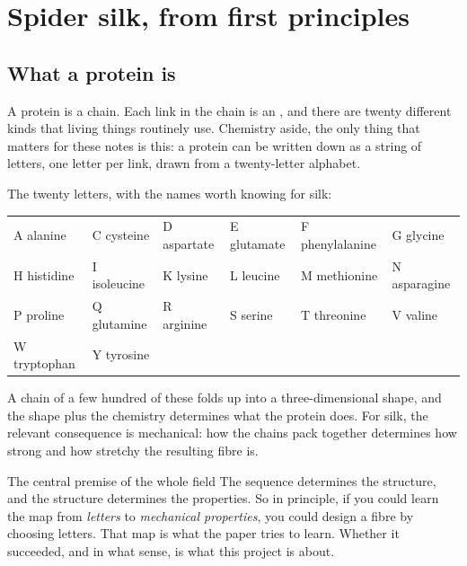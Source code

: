 \chapter{Spider silk, from first principles}
\label{ch:biology}

\section{What a protein is}

A protein is a chain. Each link in the chain is an , and there
are twenty different kinds that living things routinely use. Chemistry aside,
the only thing that matters for these notes is this: a protein can be written
down as a string of letters, one letter per link, drawn from a
twenty-letter alphabet.

\begin{center}
\end{center}

The twenty letters, with the names worth knowing for silk:

\begin{center}
\small
\begin{tabular}{llllll}
\toprule
A alanine & C cysteine & D aspartate & E glutamate & F phenylalanine & G glycine \\
H histidine & I isoleucine & K lysine & L leucine & M methionine & N asparagine \\
P proline & Q glutamine & R arginine & S serine & T threonine & V valine \\
W tryptophan & Y tyrosine & & & & \\
\bottomrule
\end{tabular}
\end{center}

A chain of a few hundred of these folds up into a three-dimensional shape, and
the shape plus the chemistry determines what the protein does. For silk, the
relevant consequence is mechanical: how the chains pack together determines how
strong and how stretchy the resulting fibre is.

\begin{keybox}{The central premise of the whole field}
The sequence determines the structure, and the structure determines the
properties. So in principle, if you could learn the map from
\emph{letters} to \emph{mechanical properties}, you could design a fibre by
choosing letters. That map is what the paper tries to learn. Whether it
succeeded, and in what sense, is what this project is about.
\end{keybox}

